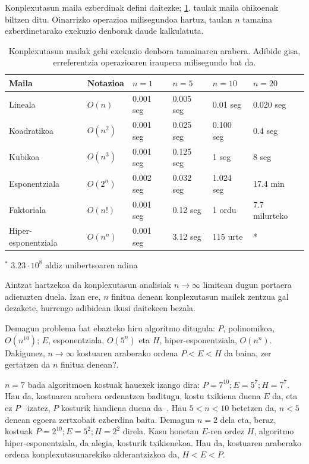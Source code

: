 \documentclass[eu]{ifirak}\usepackage[]{graphicx}\usepackage[]{color}
\begin{document}
Konplexutasun maila ezberdinak defini daitezke; \ref{tab:konplexutasun_mailak}. taulak maila ohikoenak biltzen ditu. Oinarrizko operazioa milisegundoa hartuz, taulan $n$ tamaina ezberdinetarako exekuzio denborak daude kalkulatuta.

\begin{table}[t]
\centering
\caption{Konplexutasun mailak gehi exekuzio denbora tamainaren arabera. Adibide gisa, erreferentzia operazioaren iraupena milisegundo bat da.}
\label{tab:konplexutasun_mailak}
\begin{tabular}{llllll}
Maila & Notazioa & $n=1$ & $n=5$ & $n=10$ & $n=20$\\\hline
Lineala & $O(n)$ & 0.001 seg & 0.005 seg & 0.01 seg & 0.020 seg\\
Koadratikoa & $O(n^2)$ & 0.001 seg & 0.025 seg & 0.100 seg & 0.4 seg\\
Kubikoa & $O(n^3)$ & 0.001 seg & 0.125 seg & 1 seg & 8 seg \\
Esponentziala & $O(2^n)$ & 0.002 seg & 0.032 seg & 1.024 seg &  17.4 min \\
Faktoriala & $O(n!)$ & 0.001 seg & 0.12 seg & 1 ordu & 7.7 milurteko\\
Hiper-esponentziala & $O(n^n)$ & 0.001 seg & 3.12 seg & 115 urte & * \\
\end{tabular}
\begin{flushleft}
$^*$ $3.23\cdot10^8$ aldiz unibertsoaren adina
\end{flushleft}
\end{table}

Aintzat hartzekoa da konplexutasun analisiak $n\rightarrow \infty$ limitean dugun portaera adierazten duela. Izan ere, $n$ finitua denean konplexutasun mailek zentzua gal dezakete, hurrengo adibidean ikusi daitekeen bezala.

\begin{tcolorbox}
\begin{ifexample}
Demagun problema bat ebazteko hiru algoritmo ditugula: $P$, polinomikoa, $O(n^{10})$; $E$, esponentziala, $O(5^n)$ eta $H$, hiper-esponentziala, $O(n^n)$. Dakigunez, $n\rightarrow \infty$ kostuaren araberako ordena $P<E<H$ da baina, zer gertatzen da $n$ finitua denean?.

$n=7$ bada algoritmoen kostuak hauexek izango dira: $P=7^{10}; E=5^7; H=7^7$. Hau da, kostuaren arabera ordenatzen baditugu, kostu txikiena duena $E$ da, eta ez $P$ --izatez, $P$ kosturik handiena duena da--. Hau $5<n<10$ betetzen da, $n<5$ denean egoera zertxobait ezberdina baita. Demagun $n=2$ dela eta, beraz, kostuak  $P=2^{10}; E=5^2; H=2^2$ direla. Kasu honetan $E$-ren ordez $H$, algoritmo hiper-esponentziala, da alegia, kosturik txikienekoa. Hau da, kostuaren araberako ordena konplexutasunarekiko alderantzizkoa da, $H<E<P$.
\end{ifexample}
\end{tcolorbox}
\end{document}
